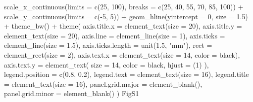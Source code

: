 \documentclass[
]{krantz}
\makeatletter
\newenvironment{Shaded}{\begin{snugshade}}{\end{snugshade}}
\newcommand{\AttributeTok}[1]{\textcolor[rgb]{0.77,0.63,0.00}{#1}}
\newcommand{\DecValTok}[1]{\textcolor[rgb]{0.00,0.00,0.81}{#1}}
\newcommand{\FloatTok}[1]{\textcolor[rgb]{0.00,0.00,0.81}{#1}}
\newcommand{\FunctionTok}[1]{\textcolor[rgb]{0.00,0.00,0.00}{#1}}
\newcommand{\NormalTok}[1]{#1}
\newcommand{\SpecialCharTok}[1]{\textcolor[rgb]{0.00,0.00,0.00}{#1}}
\newcommand{\StringTok}[1]{\textcolor[rgb]{0.31,0.60,0.02}{#1}}
\newenvironment{kframe}{%
\medskip{}
\setlength{\fboxsep}{.8em}
 \def\at@end@of@kframe{}%
 \ifinner\ifhmode%
  \def\at@end@of@kframe{\end{minipage}}%
  \begin{minipage}{\columnwidth}%
 \fi\fi%
 \def\FrameCommand##1{\hskip\@totalleftmargin \hskip-\fboxsep
 \colorbox{shadecolor}{##1}\hskip-\fboxsep
     \hskip-\linewidth \hskip-\@totalleftmargin \hskip\columnwidth}%
 \MakeFramed {\advance\hsize-\width
   \@totalleftmargin\z@ \linewidth\hsize
   \@setminipage}}%
 {\par\unskip\endMakeFramed%
 \at@end@of@kframe}
\renewenvironment{Shaded}{\begin{kframe}}{\end{kframe}}
\makeatother
\begin{document}
\begin{Shaded}
\begin{Highlighting}[]
  \FunctionTok{scale\_x\_continuous}\NormalTok{(}\AttributeTok{limits =} \FunctionTok{c}\NormalTok{(}\DecValTok{25}\NormalTok{, }\DecValTok{100}\NormalTok{),}
                     \AttributeTok{breaks =} \FunctionTok{c}\NormalTok{(}\DecValTok{25}\NormalTok{, }\DecValTok{40}\NormalTok{, }\DecValTok{55}\NormalTok{, }\DecValTok{70}\NormalTok{, }\DecValTok{85}\NormalTok{, }\DecValTok{100}\NormalTok{)) }\SpecialCharTok{+}
  \FunctionTok{scale\_y\_continuous}\NormalTok{(}\AttributeTok{limits =} \FunctionTok{c}\NormalTok{(}\SpecialCharTok{{-}}\DecValTok{5}\NormalTok{, }\DecValTok{5}\NormalTok{)) }\SpecialCharTok{+}
  \FunctionTok{geom\_hline}\NormalTok{(}\AttributeTok{yintercept =} \DecValTok{0}\NormalTok{, }\AttributeTok{size =} \FloatTok{1.5}\NormalTok{) }\SpecialCharTok{+}
  \FunctionTok{theme\_bw}\NormalTok{() }\SpecialCharTok{+}
  \FunctionTok{theme}\NormalTok{(}
    \AttributeTok{axis.title.x =} \FunctionTok{element\_text}\NormalTok{(}\AttributeTok{size =} \DecValTok{20}\NormalTok{),}
    \AttributeTok{axis.title.y =} \FunctionTok{element\_text}\NormalTok{(}\AttributeTok{size =} \DecValTok{20}\NormalTok{),}
    \AttributeTok{axis.line =} \FunctionTok{element\_line}\NormalTok{(}\AttributeTok{size =} \DecValTok{1}\NormalTok{),}
    \AttributeTok{axis.ticks =} \FunctionTok{element\_line}\NormalTok{(}\AttributeTok{size =} \FloatTok{1.5}\NormalTok{),}
    \AttributeTok{axis.ticks.length =} \FunctionTok{unit}\NormalTok{(}\FloatTok{1.5}\NormalTok{, }\StringTok{"mm"}\NormalTok{),}
    \AttributeTok{rect =} \FunctionTok{element\_rect}\NormalTok{(}\AttributeTok{size =} \DecValTok{2}\NormalTok{),}
    \AttributeTok{axis.text.x =} \FunctionTok{element\_text}\NormalTok{(}\AttributeTok{size =} \DecValTok{14}\NormalTok{, }\AttributeTok{color =} \StringTok{\textquotesingle{}black\textquotesingle{}}\NormalTok{),}
    \AttributeTok{axis.text.y =}
      \FunctionTok{element\_text}\NormalTok{(}
        \AttributeTok{size =} \DecValTok{14}\NormalTok{,}
        \AttributeTok{color =} \StringTok{\textquotesingle{}black\textquotesingle{}}\NormalTok{,}
        \AttributeTok{hjust =}\NormalTok{ (}\DecValTok{1}\NormalTok{)}
\NormalTok{      ),}
    \AttributeTok{legend.position =} \FunctionTok{c}\NormalTok{(}\FloatTok{0.8}\NormalTok{, }\FloatTok{0.2}\NormalTok{),}
    \AttributeTok{legend.text =} \FunctionTok{element\_text}\NormalTok{(}\AttributeTok{size =} \DecValTok{16}\NormalTok{),}
    \AttributeTok{legend.title =} \FunctionTok{element\_text}\NormalTok{(}\AttributeTok{size =} \DecValTok{16}\NormalTok{),}
    \AttributeTok{panel.grid.major =} \FunctionTok{element\_blank}\NormalTok{(),}
    \AttributeTok{panel.grid.minor =} \FunctionTok{element\_blank}\NormalTok{()}
\NormalTok{  )}
\NormalTok{FigS1}
\end{Highlighting}
\end{Shaded}
\end{document}
